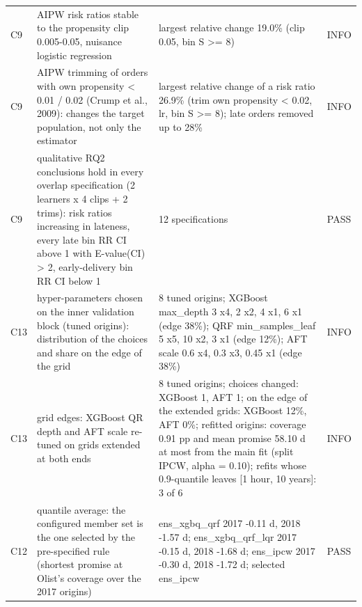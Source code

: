 \begin{table}[!htbp]
\begin{tabular}{lp{5.5cm}p{6cm}l}
C9 & AIPW risk ratios stable to the propensity clip 0.005-0.05, nuisance logistic regression & largest relative change 19.0\% (clip 0.05, bin S >= 8) & INFO \\
C9 & AIPW trimming of orders with own propensity < 0.01 / 0.02 (Crump et al., 2009): changes the target population, not only the estimator & largest relative change of a risk ratio 26.9\% (trim own propensity < 0.02, lr, bin S >= 8); late orders removed up to 28\% & INFO \\
C9 & qualitative RQ2 conclusions hold in every overlap specification (2 learners x 4 clips + 2 trims): risk ratios increasing in lateness, every late bin RR CI above 1 with E-value(CI) > 2, early-delivery bin RR CI below 1 & 12 specifications & PASS \\
C13 & hyper-parameters chosen on the inner validation block (tuned origins): distribution of the choices and share on the edge of the grid & 8 tuned origins; XGBoost max\_depth 3 x4, 2 x2, 4 x1, 6 x1 (edge 38\%); QRF min\_samples\_leaf 5 x5, 10 x2, 3 x1 (edge 12\%); AFT scale 0.6 x4, 0.3 x3, 0.45 x1 (edge 38\%) & INFO \\
C13 & grid edges: XGBoost QR depth and AFT scale re-tuned on grids extended at both ends & 8 tuned origins; choices changed: XGBoost 1, AFT 1; on the edge of the extended grids: XGBoost 12\%, AFT 0\%; refitted origins: coverage 0.91 pp and mean promise 58.10 d at most from the main fit (split IPCW, alpha = 0.10); refits whose 0.9-quantile leaves [1 hour, 10 years]: 3 of 6 & INFO \\
C12 & quantile average: the configured member set is the one selected by the pre-specified rule (shortest promise at Olist's coverage over the 2017 origins) & ens\_xgbq\_qrf 2017 -0.11 d, 2018 -1.57 d; ens\_xgbq\_qrf\_lqr 2017 -0.15 d, 2018 -1.68 d; ens\_ipcw 2017 -0.30 d, 2018 -1.72 d; selected ens\_ipcw & PASS \\
\bottomrule
\end{tabular}
\end{table}

